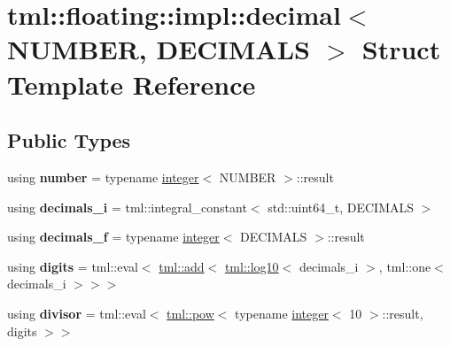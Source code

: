 \hypertarget{structtml_1_1floating_1_1impl_1_1decimal}{\section{tml\+:\+:floating\+:\+:impl\+:\+:decimal$<$ N\+U\+M\+B\+E\+R, D\+E\+C\+I\+M\+A\+L\+S $>$ Struct Template Reference}
\label{structtml_1_1floating_1_1impl_1_1decimal}
}
\subsection*{Public Types}
\begin{DoxyCompactItemize}
\item 
\hypertarget{structtml_1_1floating_1_1impl_1_1decimal_a68be11021de2f5a8b2070b7ab4fe61ca}{using {\bfseries number} = typename \hyperlink{structtml_1_1floating_1_1impl_1_1integer}{integer}$<$ N\+U\+M\+B\+E\+R $>$\+::result}\label{structtml_1_1floating_1_1impl_1_1decimal_a68be11021de2f5a8b2070b7ab4fe61ca}

\item 
\hypertarget{structtml_1_1floating_1_1impl_1_1decimal_a23741aa6ab63f0d2710e198869d94334}{using {\bfseries decimals\+\_\+i} = tml\+::integral\+\_\+constant$<$ std\+::uint64\+\_\+t, D\+E\+C\+I\+M\+A\+L\+S $>$}\label{structtml_1_1floating_1_1impl_1_1decimal_a23741aa6ab63f0d2710e198869d94334}

\item 
\hypertarget{structtml_1_1floating_1_1impl_1_1decimal_a0fc68c7b5d1565e405376a4ed8b42f29}{using {\bfseries decimals\+\_\+f} = typename \hyperlink{structtml_1_1floating_1_1impl_1_1integer}{integer}$<$ D\+E\+C\+I\+M\+A\+L\+S $>$\+::result}\label{structtml_1_1floating_1_1impl_1_1decimal_a0fc68c7b5d1565e405376a4ed8b42f29}

\item 
\hypertarget{structtml_1_1floating_1_1impl_1_1decimal_ade56bd1a7d1c9795fcea70d28284fe92}{using {\bfseries digits} = tml\+::eval$<$ \hyperlink{structtml_1_1add}{tml\+::add}$<$ \hyperlink{structtml_1_1log10}{tml\+::log10}$<$ decimals\+\_\+i $>$, tml\+::one$<$ decimals\+\_\+i $>$$>$$>$}\label{structtml_1_1floating_1_1impl_1_1decimal_ade56bd1a7d1c9795fcea70d28284fe92}

\item 
\hypertarget{structtml_1_1floating_1_1impl_1_1decimal_ac7654d902d2e81d17d8c84494decf34e}{using {\bfseries divisor} = tml\+::eval$<$ \hyperlink{structtml_1_1pow}{tml\+::pow}$<$ typename \hyperlink{structtml_1_1floating_1_1impl_1_1integer}{integer}$<$ 10 $>$\+::result, digits $>$$>$}\label{structtml_1_1floating_1_1impl_1_1decimal_ac7654d902d2e81d17d8c84494decf34e}


\end{DoxyCompactItemize}
